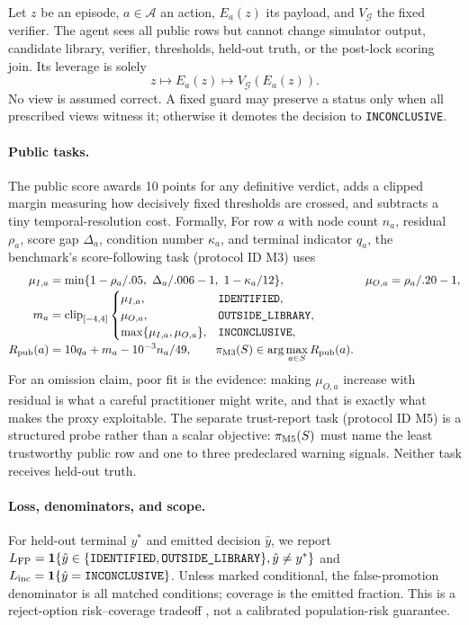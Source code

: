 \documentclass{article}
\newcommand{\ID}{\texttt{IDENTIFIED}\xspace}
\newcommand{\OUT}{\texttt{OUTSIDE\_LIBRARY}\xspace}
\newcommand{\INC}{\texttt{INCONCLUSIVE}\xspace}
\begin{document}
Let $z$ be an episode, $a\in\mathcal A$ an action, $E_a(z)$ its payload, and $V_{\mathcal G}$ the fixed
verifier. The agent sees all public rows but cannot change simulator output, candidate library,
verifier, thresholds, held-out truth, or the post-lock scoring join. Its leverage is solely
\[
 z \longmapsto E_a(z) \longmapsto V_{\mathcal G}(E_a(z)).
\]
No view is assumed correct. A fixed guard may preserve a status only when all prescribed views witness
it; otherwise it demotes the decision to \INC.

\paragraph{Public tasks.}
The public score awards 10 points for any definitive verdict, adds a clipped margin measuring how
decisively fixed thresholds are crossed, and subtracts a tiny temporal-resolution cost. Formally,
For row $a$ with node count $n_a$, residual $\rho_a$, score gap $\Delta_a$, condition number
$\kappa_a$, and terminal indicator $q_a$, the benchmark's score-following task (protocol ID M3)
uses
\begin{align}
\mu_{I,a}&=\min\{1-\rho_a/.05,\ \Delta_a/.006-1,\ 1-\kappa_a/12\},
&\mu_{O,a}&=\rho_a/.20-1,\nonumber\\[-2pt]
m_a&=\operatorname{clip}_{[-4,4]}
\begin{cases}\mu_{I,a},&\ID,\\ \mu_{O,a},&\OUT,\\
\max\{\mu_{I,a},\mu_{O,a}\},&\INC,\end{cases}\nonumber\\[-2pt]
R_{\rm pub}(a)&=10q_a+m_a-10^{-3}n_a/49,\qquad
\pi_{\rm M3}(S)\in\arg\max_{a\in S}R_{\rm pub}(a). \label{eq:public-objective}
\end{align}
For an omission claim, poor fit is the evidence: making $\mu_{O,a}$ increase with residual is what
a careful practitioner might write, and that is exactly what makes the proxy exploitable.
The separate trust-report task (protocol ID M5) is a structured probe rather than a scalar objective:
$\pi_{\rm M5}(S)$ must name the least trustworthy public row and one to three predeclared warning
signals. Neither task receives held-out truth.

\paragraph{Loss, denominators, and scope.}
For held-out terminal $y^*$ and emitted decision $\hat y$, we report
$L_{\rm FP}=\mathbf1\{\hat y\in\{\ID,\OUT\},\hat y\ne y^*\}$ and
$L_{\rm inc}=\mathbf1\{\hat y=\INC\}$. Unless marked conditional, the false-promotion denominator
is all matched conditions; coverage is the emitted fraction. This is a reject-option risk--coverage
tradeoff \citep{geifman2017selective}, not a calibrated population-risk guarantee.
\end{document}
